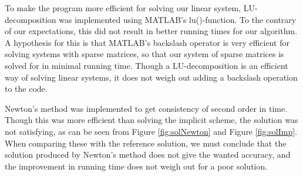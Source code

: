 To make the program more efficient for solving our linear system, LU-decomposition was implemented using MATLAB's lu()-function. To the contrary of our expectations, this did not result in better running times for our algorithm. A hypothesis for this is that MATLAB's backslash operator is very efficient for solving systems with sparse matrices, so that our system of sparse matrices is solved for in minimal running time. Though a LU-decomposition is an efficient way of solving linear systems, it does not weigh out adding a backslash operation to the code.

Newton's method was implemented to get consistency of second order in time. Though this was more efficient than solving the implicit scheme, the solution was not satisfying, as can be seen from Figure \ref{fig:solNewton} and Figure \ref{fig:solImp}. When comparing these with the reference solution, we must conclude that the solution produced by Newton's method does not give the wanted accuracy, and the improvement in running time does not weigh out for a poor solution.

